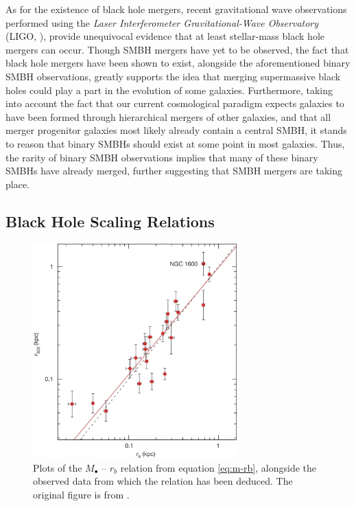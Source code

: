 \documentclass[english, twoside]{HYgradu}
\begin{document}
As for the existence of black hole mergers, recent gravitational wave observations performed using the \textit{Laser Interferometer Gravitational-Wave Observatory} (LIGO, \citealt{Abbott2016, Abbott2019}), provide unequivocal evidence that at least stellar-mass black hole mergers can occur. Though SMBH mergers have yet to be observed, the fact that black hole mergers have been shown to exist, alongside the aforementioned binary SMBH observations, greatly supports the idea that merging supermassive black holes could play a part in the evolution of some galaxies. Furthermore, taking into account the fact that our current cosmological paradigm expects galaxies to have been formed through hierarchical mergers of other galaxies, and that all merger progenitor galaxies most likely already contain a central SMBH, it stands to reason that binary SMBHs should exist at some point in most galaxies. Thus, the rarity of binary SMBH observations implies that many of these binary SMBHs have already merged, further suggesting that SMBH mergers are taking place.

\subsection{Black Hole Scaling Relations} \label{section:scaling_relation}

\begin{figure}
	\centering
	\includegraphics[width=0.7\textwidth]{thomas_mbh-rb.png}
	\caption{Plots of the $M_\bullet$ – $r_b$ relation from equation \ref{eq:m-rb}, alongside the observed data from which the relation has been deduced. The original figure is from \cite{Thomas2016}.}
	\label{figure:m-rb}
\end{figure}
\end{document}
